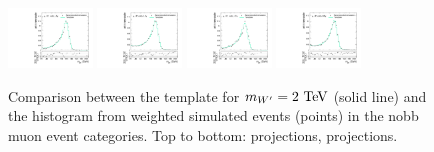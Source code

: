 \begin{figure}[htpb]
  \includegraphics[width=0.2\textwidth]{fig/2Dfit/templateVsReco_WprToWH2000_r0_MJ_mu_HP_nobb_LDy.pdf}
  \includegraphics[width=0.2\textwidth]{fig/2Dfit/templateVsReco_WprToWH2000_r0_MJ_mu_LP_nobb_LDy.pdf}
  \includegraphics[width=0.2\textwidth]{fig/2Dfit/templateVsReco_WprToWH2000_r0_MJ_mu_HP_nobb_HDy.pdf}
  \includegraphics[width=0.2\textwidth]{fig/2Dfit/templateVsReco_WprToWH2000_r0_MJ_mu_LP_nobb_HDy.pdf}\\
  \caption{
    Comparison between the \Dy\WprtoWH template for $m_{\Wpr}=2\unit{TeV}$ (solid line) and the histogram from weighted simulated events (points) in the nobb muon event categories.
    Top to bottom: \MVV projections, \MJ projections.
  }
  \label{fig:1dtemplateVsReco_WprToWH2000_Run2}
\end{figure}

